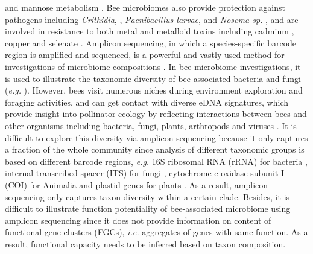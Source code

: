 \documentclass[11pt]{article}
\begin{document}
  and mannose metabolism \citep{engel2012functional,lee2015saccharide}. 
  Bee microbiomes also provide protection against pathogens including \textit{Crithidia}, 
  \citep{koch2011socially,cariveau2014variation}, \textit{Paenibacillus larvae}, 
  \citep{ebeling2016biology,forsgren2010novel} and \textit{Nosema sp.} 
  \citep{cariveau2014variation,maes2016diet}, 
  and are involved in resistance to both metal and metalloid toxins including cadmium \citep{rothman2019cadmium}, copper \citep{rothman2020direct} and selenate \citep{rothman2019bumble}. 
  \newline
  Amplicon sequencing, in which a species-specific barcode region is amplified and sequenced, is a powerful and vastly used method for investigations of microbiome compositions \citep{abdelfattah2018metabarcoding}.  
  In bee microbiome investigations, it is used to illustrate the taxonomic diversity of bee-associated bacteria and fungi (\textit{e.g.} \cite{geldert2021dietary,wang2021gut,powell9field,kapheim2021composition}). 
  However, bees visit numerous niches during environment exploration and foraging activities, and can get contact with diverse eDNA signatures, which provide insight into pollinator ecology by reflecting interactions between bees and other organisms including bacteria, fungi, plants, arthropods and viruses \citep{bovo2018shotgun,ribani2020honey,bovo2020shotgun,matsuzawa2020application}. 
  It is difficult to explore this diversity via amplicon sequencing because it only captures a fraction of the whole community since analysis of different taxonomic groups is based on different barcode regions, \textit{e.g.} 16S ribosomal RNA (rRNA) for bacteria \citep{hayashi2002phylogenetic,eckburg2005diversity}, internal transcribed spacer (ITS) for fungi \citep{nilsson2008intraspecific}, cytochrome c oxidase subunit I (COI) for Animalia \citep{hebert2003barcoding} 
  and plastid genes for plants \citep{group2009dna}. 
  As a result, amplicon sequencing only captures taxon diversity within a certain clade. 
  Besides, it is difficult to illustrate function potentiality of bee-associated microbiome using amplicon sequencing since it does not provide information on content of functional gene clusters (FGCs), \textit{i.e.} aggregates of genes with same function. 
  As a result, functional capacity needs to be inferred based on taxon composition. 
\end{document}
